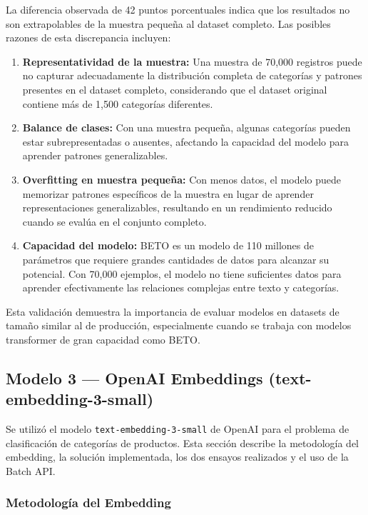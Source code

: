 \documentclass[11pt,a4paper]{article}
\begin{document}
La diferencia observada de 42 puntos porcentuales indica que los resultados no son extrapolables de la muestra pequeña al dataset completo. Las posibles razones de esta discrepancia incluyen:

\begin{enumerate}
    \item \textbf{Representatividad de la muestra:} Una muestra de 70,000 registros puede no capturar adecuadamente la distribución completa de categorías y patrones presentes en el dataset completo, considerando que el dataset original contiene más de 1,500 categorías diferentes.
    \item \textbf{Balance de clases:} Con una muestra pequeña, algunas categorías pueden estar subrepresentadas o ausentes, afectando la capacidad del modelo para aprender patrones generalizables.
    \item \textbf{Overfitting en muestra pequeña:} Con menos datos, el modelo puede memorizar patrones específicos de la muestra en lugar de aprender representaciones generalizables, resultando en un rendimiento reducido cuando se evalúa en el conjunto completo.
    \item \textbf{Capacidad del modelo:} BETO es un modelo de 110 millones de parámetros que requiere grandes cantidades de datos para alcanzar su potencial. Con 70,000 ejemplos, el modelo no tiene suficientes datos para aprender efectivamente las relaciones complejas entre texto y categorías.
\end{enumerate}

Esta validación demuestra la importancia de evaluar modelos en datasets de tamaño similar al de producción, especialmente cuando se trabaja con modelos transformer de gran capacidad como BETO.

\subsection{Modelo 3 --- OpenAI Embeddings (text-embedding-3-small)}

Se utilizó el modelo \texttt{text-embedding-3-small} de OpenAI para el problema de clasificación de categorías de productos. Esta sección describe la metodología del embedding, la solución implementada, los dos ensayos realizados y el uso de la Batch API.

\subsubsection{Metodología del Embedding}
\end{document}
